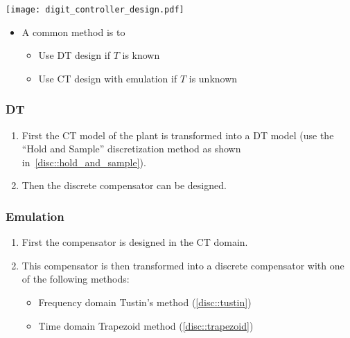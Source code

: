 \begin{center}
    \texttt{[image: digit\_controller\_design.pdf]}
\end{center}

\newpar{}

\begin{itemize}
    \item A common method is to
    \begin{itemize}
        \item Use DT design if $T$ is known
        \item Use CT design with emulation if $T$ is unknown
    \end{itemize}
\end{itemize}

\subsubsection{DT}
\begin{enumerate}
    \item First the CT model of the plant is transformed into a DT model (use the ``Hold and Sample'' discretization method as shown in~\ref{disc::hold_and_sample}).
    \item Then the discrete compensator can be designed.
\end{enumerate}

\subsubsection{Emulation}
\begin{enumerate}
    \item First the compensator is designed in the CT domain.
    \item This compensator is then transformed into a discrete compensator with one of the following methods:
          \begin{itemize}
              \item Frequency domain \textrightarrow{} Tustin's method (\ref{disc::tustin})
              \item Time domain \textrightarrow{} Trapezoid method (\ref{disc::trapezoid})
          \end{itemize}
\end{enumerate}
